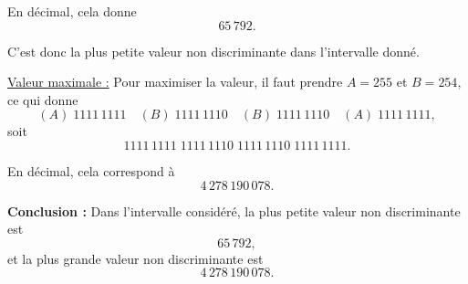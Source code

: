 \documentclass{article}
\begin{document}
\begin{enumerate}
En décimal, cela donne
\[
65\,792.
\]

C’est donc la plus petite valeur non discriminante dans l’intervalle donné.

\medskip

\underline{Valeur maximale :}  
Pour maximiser la valeur, il faut prendre $A = 255$ et $B = 254$, ce qui donne
\[
(A)\;1111\,1111 \quad (B)\;1111\,1110 \quad (B)\;1111\,1110 \quad (A)\;1111\,1111,
\]
soit
\[
1111\,1111\;1111\,1110\;1111\,1110\;1111\,1111.
\]

En décimal, cela correspond à
\[
4\,278\,190\,078.
\]

\medskip

\textbf{Conclusion :}  
Dans l’intervalle considéré, la plus petite valeur non discriminante est
\[
65\,792,
\]
et la plus grande valeur non discriminante est
\[
4\,278\,190\,078.
\]

\end{enumerate}
\end{document}
